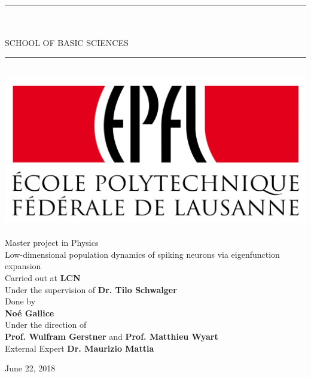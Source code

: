 \documentclass[12pt,twoside]{report}
\begin{document}
\newcommand{\HRule}{\rule{\linewidth}{0.5mm}}

\begin{titlepage}
\begin{center}

\vspace*{-3cm}

\HRule \\[0.4cm]
\\ [3mm]
\textsc{\large SCHOOL OF BASIC SCIENCES}\\[0.1cm]
\HRule \\[0.3cm]
\includegraphics[scale=0.07]{figures/epfl.png}~\\[0.5cm]

{\Large Master project in Physics}\\[1.3cm]

{ \huge Low-dimensional population dynamics of spiking neurons via eigenfunction expansion} \\[2cm] 

{\large Carried out at \textbf{LCN}}\\[3mm]
{\large Under the supervision of \textbf{Dr. Tilo Schwalger}}\\[1.4cm]

{\Large Done by}\\[3mm]
{\Large \textbf{Noé Gallice}}\\[1.4cm]

{\large Under the direction of \\[3mm]
	\textbf{Prof. Wulfram Gerstner} and \textbf{
		Prof. Matthieu Wyart}}\\[14mm]


{\large External Expert \textbf{Dr. Maurizio Mattia}}%

\vfill
{\large June 22, 2018}

\end{center}
\end{titlepage}
\end{document}
